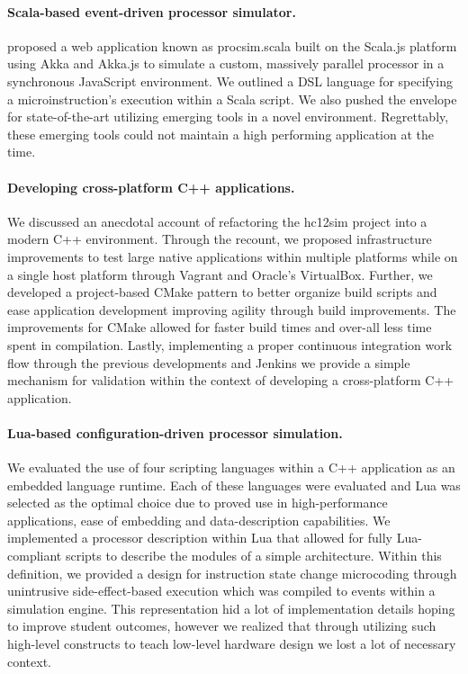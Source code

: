\paragraph{Scala-based event-driven processor simulator.}  proposed a web application known as procsim.scala built on the Scala.js platform using Akka and Akka.js to simulate a custom, massively parallel processor in a synchronous JavaScript environment. We outlined a DSL language for specifying a microinstruction's execution within a Scala script. We also pushed the envelope for state-of-the-art utilizing emerging tools in a novel environment. Regrettably, these emerging tools could not maintain a high performing application at the time.

\paragraph{Developing cross-platform C++ applications.} We discussed an anecdotal account of refactoring the hc12sim project into a modern C++ environment. Through the recount, we proposed infrastructure improvements to test large native applications within multiple platforms while on a single host platform through Vagrant and Oracle's VirtualBox. Further, we developed a project-based CMake pattern to better organize build scripts and ease application development improving agility through build improvements. The improvements for CMake allowed for faster build times and over-all less time spent in compilation. Lastly, implementing a proper continuous integration work flow through the previous developments and Jenkins we provide a simple mechanism for validation within the context of developing a cross-platform C++ application.

\paragraph{Lua-based configuration-driven processor simulation.} We evaluated the use of four scripting languages within a C++ application as an embedded language runtime. Each of these languages were evaluated and Lua was selected as the optimal choice due to proved use in high-performance applications, ease of embedding and data-description capabilities. We implemented a processor description within Lua that allowed for fully Lua-compliant scripts to describe the modules of a simple architecture. Within this definition, we provided a design for instruction state change microcoding through unintrusive side-effect-based execution which was compiled to events within a simulation engine. This representation hid a lot of implementation details hoping to improve student outcomes, however we realized that through utilizing such high-level constructs to teach low-level hardware design we lost a lot of necessary context.

